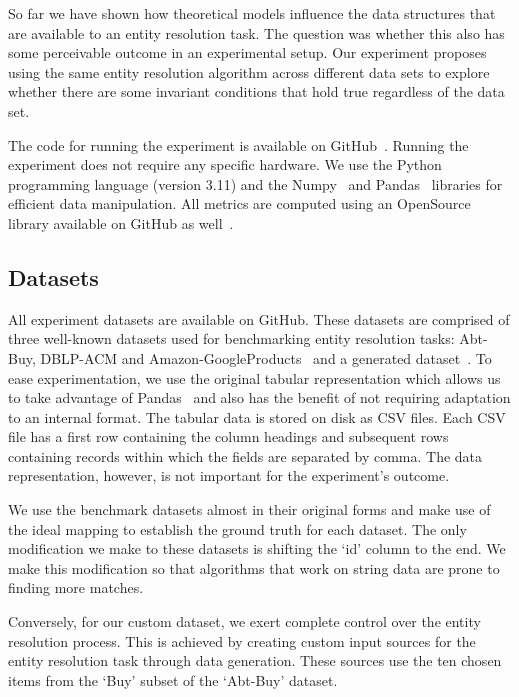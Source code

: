 So far we have shown how theoretical models influence the data structures
that are available to an entity resolution task.
The question was whether this also has some perceivable outcome in an
experimental setup.
Our experiment proposes using the same entity resolution algorithm across
different data sets to explore whether there are some invariant conditions
that hold true regardless of the data set.

The code for running the experiment is available on GitHub~\cite{matchescu}.
Running the experiment does not require any specific hardware.
We use the Python~\cite{python} programming language (version 3.11) and the
Numpy~\cite{numpy} and Pandas~\cite{pandas2023} libraries for efficient
data manipulation.
All metrics are computed using an OpenSource library available on GitHub as
well~\cite{matchescu-er-metrics2023}.

\subsection{Datasets}\label{subsec:data}

All experiment datasets are available on GitHub\cite{expdata2023}.
These datasets are comprised of three well-known datasets used for
benchmarking entity resolution tasks: Abt-Buy, DBLP-ACM and
Amazon-GoogleProducts~\cite{vldb2010} and a generated dataset~\cite{expdata2023}.
To ease experimentation, we use the original tabular representation
which allows us to take advantage of Pandas~\cite{pandas2010,pandas2023}
and also has the benefit of not requiring adaptation to an internal format.
The tabular data is stored on disk as CSV files.
Each CSV file has a first row containing the column headings and subsequent
rows containing records within which the fields are separated by comma.
The data representation, however, is not important for the experiment's
outcome.

We use the benchmark datasets almost in their original forms and make use
of the ideal mapping to establish the ground truth for each dataset.
The only modification we make to these datasets is shifting the `id' column
to the end.
We make this modification so that algorithms that work on string data are prone
to finding more matches.

Conversely, for our custom dataset, we exert complete control over the
entity resolution process.
This is achieved by creating custom input sources for the entity resolution
task through data generation.
These sources use the ten chosen items from the `Buy' subset of the
`Abt-Buy' dataset.

